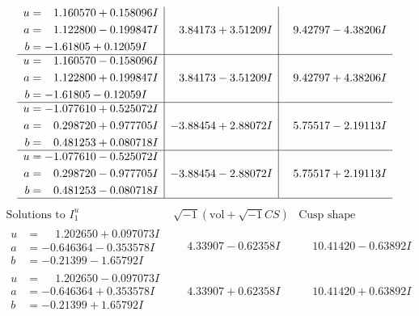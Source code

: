 \documentclass[1p]{elsarticle_modified}
\theoremstyle{definition}
\newcommand{\I}{\sqrt{-1}}
\begin{document}
$$\begin{array}{c|c|c}
\begin{aligned}
u &= \phantom{-}1.160570 + 0.158096 I \\
a &= \phantom{-}1.122800 - 0.199847 I \\
b &= -1.61805 + 0.12059 I\end{aligned}
 & \phantom{-}3.84173 + 3.51209 I & \phantom{-}9.42797 - 4.38206 I \\ \hline\begin{aligned}
u &= \phantom{-}1.160570 - 0.158096 I \\
a &= \phantom{-}1.122800 + 0.199847 I \\
b &= -1.61805 - 0.12059 I\end{aligned}
 & \phantom{-}3.84173 - 3.51209 I & \phantom{-}9.42797 + 4.38206 I \\ \hline\begin{aligned}
u &= -1.077610 + 0.525072 I \\
a &= \phantom{-}0.298720 + 0.977705 I \\
b &= \phantom{-}0.481253 + 0.080718 I\end{aligned}
 & -3.88454 + 2.88072 I & \phantom{-}5.75517 - 2.19113 I \\ \hline\begin{aligned}
u &= -1.077610 - 0.525072 I \\
a &= \phantom{-}0.298720 - 0.977705 I \\
b &= \phantom{-}0.481253 - 0.080718 I\end{aligned}
 & -3.88454 - 2.88072 I & \phantom{-}5.75517 + 2.19113 I\\
 \hline 
 \end{array}$$\newpage$$\begin{array}{c|c|c}  
\text{Solutions to }I^u_{1}& \I (\text{vol} + \sqrt{-1}CS) & \text{Cusp shape}\\
 \hline 
\begin{aligned}
u &= \phantom{-}1.202650 + 0.097073 I \\
a &= -0.646364 - 0.353578 I \\
b &= -0.21399 - 1.65792 I\end{aligned}
 & \phantom{-}4.33907 - 0.62358 I & \phantom{-}10.41420 - 0.63892 I \\ \hline\begin{aligned}
u &= \phantom{-}1.202650 - 0.097073 I \\
a &= -0.646364 + 0.353578 I \\
b &= -0.21399 + 1.65792 I\end{aligned}
 & \phantom{-}4.33907 + 0.62358 I & \phantom{-}10.41420 + 0.63892 I \\ \hline\begin{aligned}

\end{aligned}
\end{array}$$
\end{document}
